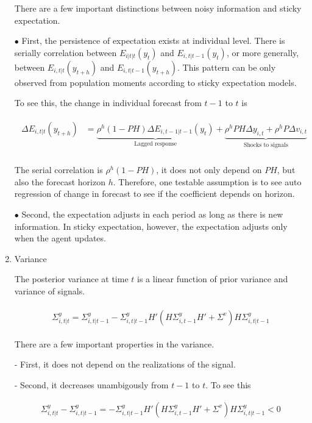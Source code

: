 \documentclass[]{article}
\begin{document}
\begin{enumerate}
There are a few important distinctions between noisy information and sticky expectation. 

$\bullet$  First, the persistence of expectation exists at individual level. There is serially correlation between $E_{i|t|t}(y_t)$ and $E_{i,t|t-1}(y_{t})$, or more generally, between $E_{i,t|t}(y_{t+h})$ and $E_{i,t|t-1}(y_{t+h})$. This pattern can be only observed from population moments according to sticky expectation models. 


To see this, the change in individual forecast from $t-1$ to $t$ is 

\begin{eqnarray}
\begin{aligned}
\Delta E_{i,t|t}(y_{t+h}) & = \underbrace{\rho^h (1-PH)\Delta E_{i,t-1|t-1}(y_{t})}_{\text{Lagged response}} + \underbrace{\rho^hPH \Delta y_{i,t} + \rho^h P\Delta v_{i,t}}_{\text{Shocks to signals}}\\
\end{aligned}
\end{eqnarray}

The serial correlation is $\rho^h(1-PH)$, it does not only depend on $PH$, but also the forecast horizon $h$. Therefore, one testable assumption is to see auto regression of change in forecast to see if the coefficient depends on horizon. 

$\bullet$  Second, the expectation adjusts in each period as long as there is new information. In sticky expectation, however, the expectation adjusts only when the agent updates. 

\item Variance

The posterior variance at time $t$ is a linear function of prior variance and variance of signals. 

\begin{eqnarray}
\begin{aligned}
\Sigma^y_{i,t|t} = \Sigma^y_{i,t|t-1} - \Sigma^y_{i,t|t-1} H'(H \Sigma^y_{i,t-1} H' +\Sigma^v) H \Sigma^y_{i,t|t-1} 
\end{aligned}
\end{eqnarray}

There are a few important properties in the variance. 

- First, it does not depend on the realizations of the signal. 

- Second, it decreases unambigously from $t-1$ to $t$. To see this 

\begin{eqnarray}
\Sigma^y_{i,t|t} - \Sigma^y_{i,t|t-1} = - \Sigma^y_{i,t|t-1} H'(H \Sigma^y_{i,t-1} H' +\Sigma^v) H \Sigma^y_{i,t|t-1} <0
\end{eqnarray}


\end{enumerate}
\end{document}
